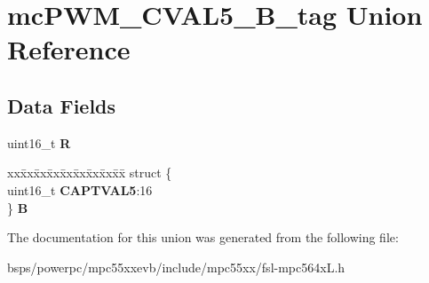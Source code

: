 \hypertarget{unionmcPWM__CVAL5__16B__tag}{}\section{mc\+P\+W\+M\+\_\+\+C\+V\+A\+L5\+\_\+B\+\_\+tag Union Reference}
\label{unionmcPWM__CVAL5__16B__tag}
\subsection*{Data Fields}
\begin{DoxyCompactItemize}
\item 
\mbox{\label{unionmcPWM__CVAL5__16B__tag_a94a93ac98458e9d127d5217b85d96398}} 
uint16\+\_\+t {\bfseries R}
\item 
\mbox{\label{unionmcPWM__CVAL5__16B__tag_a32e40a654d5b0fe3f615f0319e7eab93}} 
\begin{tabbing}
xx\=xx\=xx\=xx\=xx\=xx\=xx\=xx\=xx\=\kill
struct \{\\
\>uint16\_t {\bfseries CAPTVAL5}:16\\
\} {\bfseries B}\\

\end{tabbing}\end{DoxyCompactItemize}


The documentation for this union was generated from the following file\+:\begin{DoxyCompactItemize}
\item 
bsps/powerpc/mpc55xxevb/include/mpc55xx/fsl-\/mpc564x\+L.\+h\end{DoxyCompactItemize}

